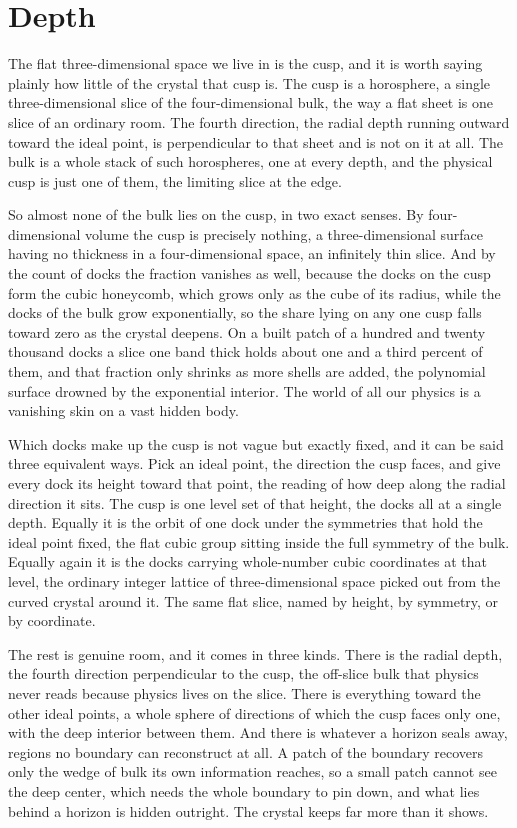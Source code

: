 \section{Depth}

The flat three-dimensional space we live in is the cusp, and it is worth saying plainly how little of the crystal that cusp is. The cusp is a horosphere, a single three-dimensional slice of the four-dimensional bulk, the way a flat sheet is one slice of an ordinary room. The fourth direction, the radial depth running outward toward the ideal point, is perpendicular to that sheet and is not on it at all. The bulk is a whole stack of such horospheres, one at every depth, and the physical cusp is just one of them, the limiting slice at the edge.

So almost none of the bulk lies on the cusp, in two exact senses. By four-dimensional volume the cusp is precisely nothing, a three-dimensional surface having no thickness in a four-dimensional space, an infinitely thin slice. And by the count of docks the fraction vanishes as well, because the docks on the cusp form the cubic honeycomb, which grows only as the cube of its radius, while the docks of the bulk grow exponentially, so the share lying on any one cusp falls toward zero as the crystal deepens. On a built patch of a hundred and twenty thousand docks a slice one band thick holds about one and a third percent of them, and that fraction only shrinks as more shells are added, the polynomial surface drowned by the exponential interior. The world of all our physics is a vanishing skin on a vast hidden body.

Which docks make up the cusp is not vague but exactly fixed, and it can be said three equivalent ways. Pick an ideal point, the direction the cusp faces, and give every dock its height toward that point, the reading of how deep along the radial direction it sits. The cusp is one level set of that height, the docks all at a single depth. Equally it is the orbit of one dock under the symmetries that hold the ideal point fixed, the flat cubic group sitting inside the full symmetry of the bulk. Equally again it is the docks carrying whole-number cubic coordinates at that level, the ordinary integer lattice of three-dimensional space picked out from the curved crystal around it. The same flat slice, named by height, by symmetry, or by coordinate.

The rest is genuine room, and it comes in three kinds. There is the radial depth, the fourth direction perpendicular to the cusp, the off-slice bulk that physics never reads because physics lives on the slice. There is everything toward the other ideal points, a whole sphere of directions of which the cusp faces only one, with the deep interior between them. And there is whatever a horizon seals away, regions no boundary can reconstruct at all. A patch of the boundary recovers only the wedge of bulk its own information reaches, so a small patch cannot see the deep center, which needs the whole boundary to pin down, and what lies behind a horizon is hidden outright. The crystal keeps far more than it shows.

